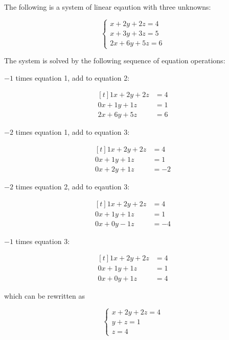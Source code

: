\documentclass[a4paper,12pt]{article}
\begin{document}
\begin{exm}
 The following is a system of linear eqaution with three unknowns:

 $$\begin{cases}
   x+2y+2z=4\\
   x+3y+3z=5\\
   2x+6y+5z=6
  \end{cases}$$\s

 The system is solved by the following sequence of equation operations:

 \begin{nlist}
  \item $-1$ times equation 1, add to equation 2:

  $$\begin{aligned}[t]
    1x+2y+2z&=4\\
    0x+1y+1z&=1\\
    2x+6y+5z&=6
  \end{aligned}$$

  \item $-2$ times equation 1, add to equation 3:

  $$\begin{aligned}[t]
    1x+2y+2z&=4\\
    0x+1y+1z&=1\\
    0x+2y+1z&=-2
  \end{aligned}$$

  \item $-2$ times equation 2, add to eqaution 3:

  $$\begin{aligned}[t]
    1x+2y+2z&=4\\
    0x+1y+1z&=1\\
    0x+0y-1z&=-4
  \end{aligned}$$

  \item $-1$ times equation 3:

  $$\begin{aligned}[t]
    1x+2y+2z&=4\\
    0x+1y+1z&=1\\
    0x+0y+1z&=4
  \end{aligned}$$
 \end{nlist}

 which can be rewritten as

 $$\begin{cases}
   x+2y+2z=4\\
   y+z=1\\
   z=4
  \end{cases}$$\s
\end{exm}\n
\end{document}
